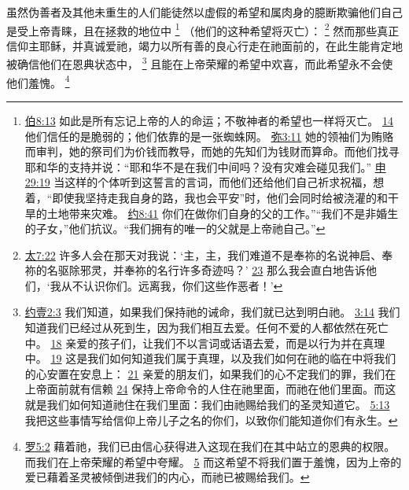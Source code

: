 \documentclass[12pt, a4paper, oneside]{ctexart}
\newcounter{parnum}[section]
\newcommand{\N}{%
   \noindent\refstepcounter{parnum}%
    \makebox[\parindent][l]{\textbf{\arabic{parnum}.}}}
\begin{document}
\N 虽然伪善者及其他未重生的人们能徒然以虚假的希望和属肉身的臆断欺骗他们自己是受上帝青睐，且在拯救的地位中
	\footnote {
		\href{https://biblehub.com/job/8-13.htm}{伯8:13} 如此是所有忘记上帝的人的命运；不敬神者的希望也一样将灭亡。
		\href{https://biblehub.com/job/8-14.htm}{14} 他们信任的是脆弱的；他们依靠的是一张蜘蛛网。
		\href{https://biblehub.com/micah/3-11.htm}{弥3:11} 她的领袖们为贿赂而审判，她的祭司们为价钱而教导，而她的先知们为钱财而算命。而他们找寻耶和华的支持并说：“耶和华不是在我们中间吗？没有灾难会碰见我们。”
		\href{https://biblehub.com/deuteronomy/29-19.htm}{申29:19} 当这样的个体听到这誓言的言词，而他们还给他们自己祈求祝福，想着，“即使我坚持走我自身的路，我也会平安”时，他们会同时给被浇灌的和干旱的土地带来灾难。
		\href{https://biblehub.com/john/8-41.htm}{约8:41} 你们在做你们自身的父的工作。”“我们不是非婚生的子女，”他们抗议。“我们拥有的唯一的父就是上帝祂自己。”
	}
	（他们的这种希望将灭亡）：
	\footnote {
		\href{https://biblehub.com/matthew/7-22.htm}{太7:22} 许多人会在那天对我说：‘主，主，我们难道不是奉祢的名说神启、奉祢的名驱除邪灵，并奉祢的名行许多奇迹吗？’
		\href{https://biblehub.com/matthew/7-23.htm}{23} 那么我会直白地告诉他们，‘我从不认识你们。远离我，你们这些作恶者！’
	}
	然而那些真正信仰主耶稣，并真诚爱祂，竭力以所有善的良心行走在祂面前的，在此生能肯定地被确信他们在恩典状态中，
	\footnote {
		\href{https://biblehub.com/1_john/2-3.htm}{约壹2:3} 我们知道，如果我们保持祂的诫命，我们就已达到明白祂。
		\href{https://biblehub.com/1_john/3-14.htm}{3:14} 我们知道我们已经过从死到生，因为我们相互去爱。任何不爱的人都依然在死亡中。
		\href{https://biblehub.com/1_john/3-18.htm}{18} 亲爱的孩子们，让我们不以言词或话语去爱，而是以行为并在真理中。
		\href{https://biblehub.com/1_john/3-19.htm}{19} 这是我们如何知道我们属于真理，以及我们如何在祂的临在中将我们的心安置在安息上：
		\href{https://biblehub.com/1_john/3-21.htm}{21} 亲爱的朋友们，如果我们的心不定我们的罪，我们在上帝面前就有信赖
		\href{https://biblehub.com/1_john/3-24.htm}{24} 保持上帝命令的人住在祂里面，而祂在他们里面。而这就是我们如何知道祂住在我们里面：我们由祂赐给我们的圣灵知道它。
		\href{https://biblehub.com/1_john/5-13.htm}{5:13} 我把这些事情写给信仰上帝儿子之名的你们，以致你们能知道你们有永生。
	}
	且能在上帝荣耀的希望中欢喜，而此希望永不会使他们羞愧。
	\footnote {
		\href{https://biblehub.com/romans/5-2.htm}{罗5:2} 藉着祂，我们已由信心获得进入这现在我们在其中站立的恩典的权限。而我们在上帝荣耀的希望中夸耀。
		\href{https://biblehub.com/romans/5-5.htm}{5} 而这希望不将我们置于羞愧，因为上帝的爱已藉着圣灵被倾倒进我们的内心，而祂已被赐给我们。
	}
\end{document}
